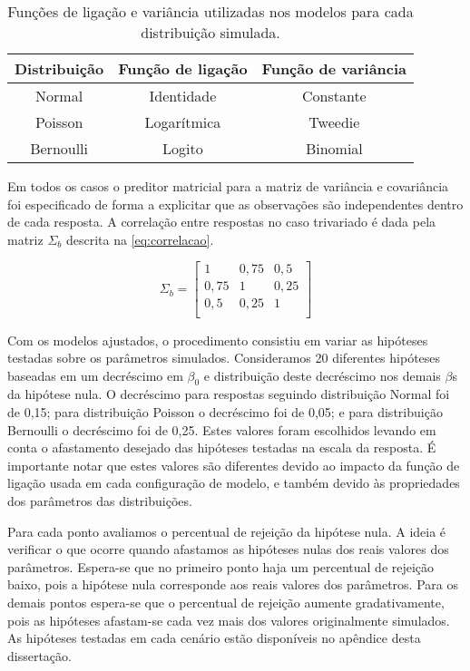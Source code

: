 \begin{table}[H]
\centering
\begin{tabular}{ccc}
\hline
Distribuição & Função de ligação & Função de variância \\ \hline
Normal       & Identidade        & Constante           \\
Poisson      & Logarítmica       & Tweedie             \\
Bernoulli    & Logito            & Binomial            \\ \hline
\end{tabular}
\caption{Funções de ligação e variância utilizadas nos modelos para cada distribuição simulada.}
\label{tab:link_var}
\end{table}

Em todos os casos o preditor matricial para a matriz de variância e covariância foi especificado de forma a explicitar que as observações são independentes dentro de cada resposta. A correlação entre respostas no caso trivariado é dada pela matriz $\Sigma_b$ descrita na \autoref{eq:correlacao}.

\begin{equation} \label{eq:correlacao}
\Sigma_b = 
\begin{bmatrix}
1    & 0,75 & 0,5  \\
0,75 & 1    & 0,25 \\
0,5  & 0,25 & 1    \\
\end{bmatrix}
\end{equation}

Com os modelos ajustados, o procedimento consistiu em variar as hipóteses testadas sobre os parâmetros simulados. Consideramos 20 diferentes hipóteses baseadas em um decréscimo em $\beta_0$ e distribuição deste decréscimo nos demais $\beta$s da hipótese nula. O decréscimo para respostas seguindo distribuição Normal foi de 0,15; para distribuição Poisson o decréscimo foi de 0,05; e para distribuição Bernoulli o decréscimo foi de 0,25. Estes valores foram escolhidos levando em conta o afastamento desejado das hipóteses testadas na escala da resposta. É importante notar que estes valores são diferentes devido ao impacto da função de ligação usada em cada configuração de modelo, e também devido às propriedades dos parâmetros das distribuições.

Para cada ponto avaliamos o percentual de rejeição da hipótese nula. A ideia é verificar o que ocorre quando afastamos as hipóteses nulas dos reais valores dos parâmetros. Espera-se que no primeiro ponto haja um percentual de rejeição baixo, pois a hipótese nula corresponde aos reais valores dos parâmetros. Para os demais pontos espera-se que o percentual de rejeição aumente gradativamente, pois as hipóteses afastam-se cada vez mais dos valores originalmente simulados. As hipóteses testadas em cada cenário estão disponíveis no apêndice desta dissertação.
 
